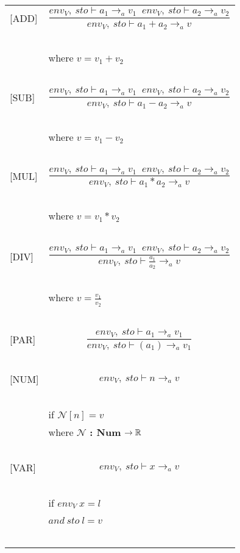 \begin{table}
\begin{tabular}{l l}
[ADD] & \[\frac{env_V, \: sto \vdash a_1 \rightarrow_a v_1 \;\; env_V, \: sto \vdash a_2 \rightarrow_a v_2}{env_V, \: sto \vdash a_1 + a_2 \rightarrow_a v}\] \\
~ & ~ \\
~ & \indent\indent where $v=v_1+v_2$ \\
~ & ~ \\

[SUB] & \[\frac{env_V, \: sto \vdash a_1 \rightarrow_a v_1 \;\; env_V, \: sto \vdash a_2 \rightarrow_a v_2}{env_V, \: sto \vdash a_1 - a_2 \rightarrow_a v}\] \\
~ & ~ \\
~ & \indent\indent where $v=v_1-v_2$ \\ 
~ & ~ \\

[MUL] & \[\frac{env_V, \: sto \vdash a_1 \rightarrow_a v_1 \;\; env_V, \: sto \vdash a_2 \rightarrow_a v_2}{env_V, \: sto \vdash a_1 * a_2 \rightarrow_a v}\] \\
~ & ~ \\
~ & \indent\indent where $v=v_1 * v_2$ \\ 
~ & ~ \\

[DIV] & \[\frac{env_V,\: sto \vdash a_1 \rightarrow_a v_1 \;\; env_V,\: sto \vdash a_2 \rightarrow_a v_2}{env_V, \: sto \vdash \frac{a_1}{a_2} \rightarrow_a v}\] \\
~ & ~ \\
~ & \indent\indent where $v=\frac{v_1}{v_2}$ \\ 
~ & ~ \\

[PAR] & \[\frac{env_V, \: sto \vdash a_1 \rightarrow_a v_1}{env_V, \: sto \vdash (a_1) \rightarrow_a v_1}\] \\
~ & ~ \\

[NUM] & \[env_V, \: sto \vdash n \rightarrow_a v\] \\
~ & ~ \\
~ & \indent\indent if $\mathcal{N} [n]=v$ \\
~ & \indent\indent where $\mathcal{N}$ \textbf{: Num} $\rightarrow \mathbb{R}$ \\
~ & ~ \\

[VAR] & \[env_V, \: sto \vdash x \rightarrow_a v\] \\
~ & ~ \\
~ & \indent\indent if $env_V \: x=l$\\
~ & \indent\indent $and \: sto \: l = v$ \\
~ & ~ \\


\end{tabular}
\end{table}
